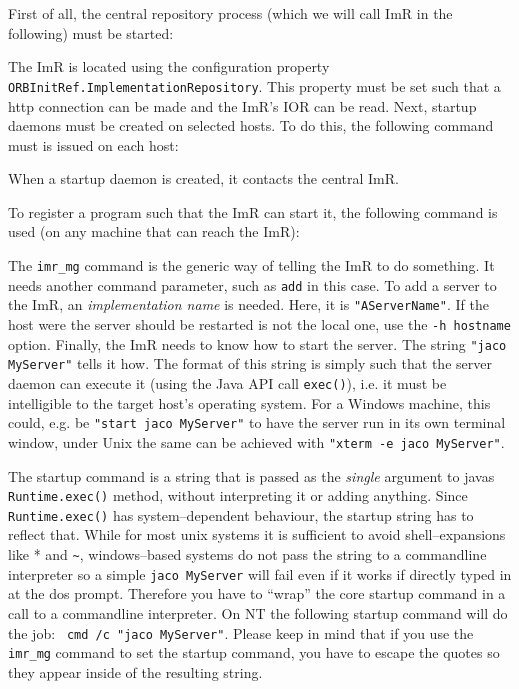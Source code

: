 \documentclass[12pt]{scrbook}
\begin{document}
First of all, the central repository process (which we will call ImR
in the following) must be started:


The   ImR   is  located   using   the   configuration  property   {\tt
ORBInitRef.ImplementationRepository}.  This property  must be set such
that  a  http  connection  can  be  made and  the  ImR's  IOR  can  be
read. Next, startup  daemons must be created on  selected hosts. To do
this, the following command must is issued on each host:


When a startup  daemon is created, it contacts  the central ImR.

To register  a program such that  the ImR can start  it, the following
command is used (on any machine that can reach the ImR):


The {\tt imr\_mg} command is the  generic way of telling the ImR to do
something. It  needs another command  parameter, such as {\tt  add} in
this case. To add a server to the ImR, an {\em implementation name} is
needed. Here, it is {\tt  "AServerName"}.  If the host were the server
should be  restarted is not the  local one, use the  {\tt -h hostname}
option.  Finally, the  ImR needs to know how to  start the server. The
string {\tt "jaco  MyServer"} tells it how. The  format of this string
is simply such  that the server daemon can execute  it (using the Java
API call  {\tt exec()}), i.e.  it  must be intelligible  to the target
host's operating system.   For a Windows machine, this  could, e.g. be
{\tt "start jaco MyServer"} to have the server run in its own terminal
window, under Unix  the same can be achieved with  {\tt "xterm -e jaco
MyServer"}.

The startup  command is a  string that is  passed as the  {\em single}
argument to javas {\tt Runtime.exec()} method, without interpreting it
or adding  anything. Since {\tt  Runtime.exec()} has system--dependent
behaviour, the startup string has to reflect that. While for most unix
systems  it  is  sufficient  to  avoid shell--expansions  like  *  and
\verb+~+,  windows--based  systems  do   not  pass  the  string  to  a
commandline interpreter so a simple {\tt jaco MyServer} will fail even
if it works if directly typed in at the dos prompt. Therefore you have
to  ``wrap'' the  core  startup command  in  a call  to a  commandline
interpreter. On NT the following startup command will do the job: {\tt
cmd /c "jaco MyServer"}.  Please keep in mind that if you use the {\tt
imr\_mg} command  to set the startup  command, you have  to escape the
quotes so they appear inside of the resulting string.
\end{document}
